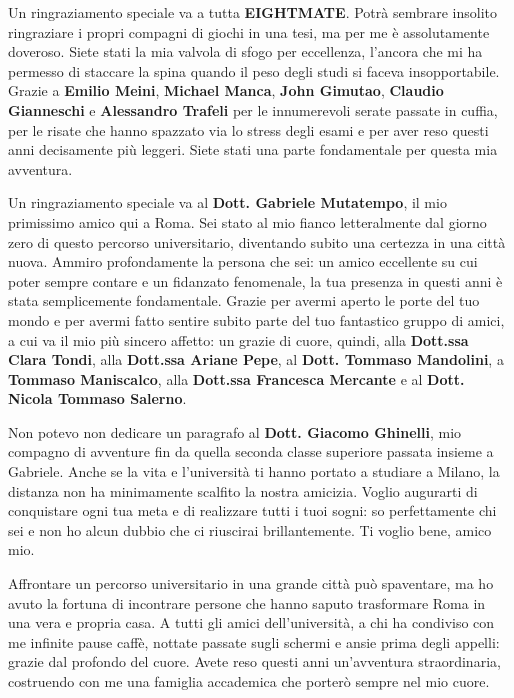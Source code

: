 \noindent
Un ringraziamento speciale va a tutta \textbf{EIGHTMATE}. Potrà sembrare insolito ringraziare i propri compagni di giochi in una tesi, ma per me è assolutamente doveroso. Siete stati la mia valvola di sfogo per eccellenza, l'ancora che mi ha permesso di staccare la spina quando il peso degli studi si faceva insopportabile. Grazie a \textbf{Emilio Meini}, \textbf{Michael Manca}, \textbf{John Gimutao}, \textbf{Claudio Gianneschi} e \textbf{Alessandro Trafeli} per le innumerevoli serate passate in cuffia, per le risate che hanno spazzato via lo stress degli esami e per aver reso questi anni decisamente più leggeri. Siete stati una parte fondamentale per questa mia avventura.

Un ringraziamento speciale va al \textbf{Dott. Gabriele Mutatempo}, il mio primissimo amico qui a Roma. Sei stato al mio fianco letteralmente dal giorno zero di questo percorso universitario, diventando subito una certezza in una città nuova. Ammiro profondamente la persona che sei: un amico eccellente su cui poter sempre contare e un fidanzato fenomenale, la tua presenza in questi anni è stata semplicemente fondamentale. Grazie per avermi aperto le porte del tuo mondo e per avermi fatto sentire subito parte del tuo fantastico gruppo di amici, a cui va il mio più sincero affetto: un grazie di cuore, quindi, alla \textbf{Dott.ssa Clara Tondi}, alla \textbf{Dott.ssa Ariane Pepe}, al \textbf{Dott. Tommaso Mandolini}, a \textbf{Tommaso Maniscalco}, alla \textbf{Dott.ssa Francesca Mercante} e al \textbf{Dott. Nicola Tommaso Salerno}.

Non potevo non dedicare un paragrafo al \textbf{Dott. Giacomo Ghinelli}, mio compagno di avventure fin da quella seconda classe superiore passata insieme a Gabriele. Anche se la vita e l'università ti hanno portato a studiare a Milano, la distanza non ha minimamente scalfito la nostra amicizia. Voglio augurarti di conquistare ogni tua meta e di realizzare tutti i tuoi sogni: so perfettamente chi sei e non ho alcun dubbio che ci riuscirai brillantemente. Ti voglio bene, amico mio.

\vspace{1em}

\noindent
Affrontare un percorso universitario in una grande città può spaventare, ma ho avuto la fortuna di incontrare persone che hanno saputo trasformare Roma in una vera e propria casa. A tutti gli amici dell'università, a chi ha condiviso con me infinite pause caffè, nottate passate sugli schermi e ansie prima degli appelli: grazie dal profondo del cuore. Avete reso questi anni un'avventura straordinaria, costruendo con me una famiglia accademica che porterò sempre nel mio cuore.

